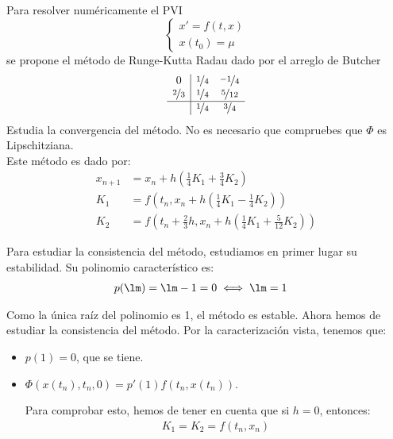 \begin{ejercicio}
    Para resolver numéricamente el PVI
    \begin{equation*}
        \begin{cases}
            x' = f(t, x) \\
            x(t_0) = \mu
        \end{cases}
    \end{equation*}
    se propone el método de Runge-Kutta Radau dado por el arreglo de Butcher
    \begin{equation*}
        \begin{array}{c|ccc}
            0 & \nicefrac{1}{4} & \nicefrac{-1}{4} \\
            \nicefrac{2}{3} & \nicefrac{1}{4} & \nicefrac{5}{12} \\ \hline
            & \nicefrac{1}{4} & \nicefrac{3}{4} 
        \end{array}
    \end{equation*}
    Estudia la convergencia del método. No es necesario que compruebes que $\Phi$ es Lipschitziana.\\

    Este método es dado por:
    \begin{align*}
        x_{n+1} &= x_n + h\left(\frac{1}{4}K_1 + \frac{3}{4}K_2\right) \\
        K_1 &= f(t_n, x_n + h\left(\frac{1}{4}K_1 - \frac{1}{4}K_2\right)) \\
        K_2 &= f\left(t_n + \frac{2}{3}h, x_n + h\left(\frac{1}{4}K_1 + \frac{5}{12}K_2\right)\right)
    \end{align*}

    Para estudiar la consistencia del método, estudiamos en primer lugar su estabilidad. Su polinomio característico es:
    \begin{align*}
        p(\lm) &= \lm -1 = 0 \iff \lm = 1
    \end{align*}

    Como la única raíz del polinomio es 1, el método es estable. Ahora hemos de estudiar la consistencia del método. Por la caracterización vista, tenemos que:
    \begin{itemize}
        \item $p(1)=0$, que se tiene.
        \item $\Phi(x(t_n), t_n, 0) = p'(1)f(t_n, x(t_n))$.
        
        Para comprobar esto, hemos de tener en cuenta que si $h=0$, entonces:
        \begin{align*}
            K_1 = K_2 = f(t_n, x_n)
        \end{align*}


\end{itemize}
\end{ejercicio}
